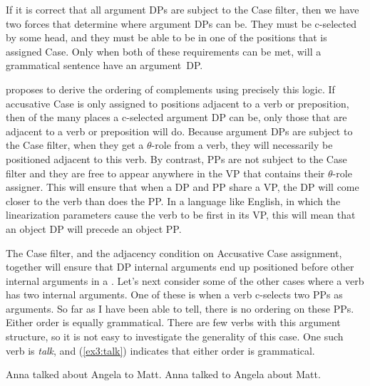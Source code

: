 If it is correct that all argument DPs are subject to the Case filter, then we have two forces that determine where argument DPs can be. They must be c-selected by some head, and they must be able to be in one of the positions that is assigned Case. Only when both of these requirements can be met, will a grammatical sentence have an argument~DP.

\citet{Stowell:1981} proposes to derive the ordering of complements using precisely this logic. If accusative Case is only assigned to positions adjacent to a verb or preposition, then of the many places a c-selected argument DP can be, only those that are adjacent to a verb or preposition will do. Because argument DPs are subject to the Case filter, when they get a \mbox{$\theta$-role} from a verb, they will necessarily be positioned adjacent to this verb. By contrast, PPs are not subject to the Case filter and they are free to appear anywhere in the VP that contains their \mbox{$\theta$-role} assigner. This will ensure that when a DP and PP share a VP, the DP will come closer to the verb than does the PP. In a language like English, in which the linearization parameters cause the verb to be first in its VP, this will mean that an object DP will precede an object PP. 

The Case filter, and the adjacency condition on Accusative Case assignment, together will ensure that DP internal arguments end up positioned before other internal arguments in a . Let's next consider some of the other cases where a verb has two internal arguments. One of these is when a verb c-selects two PPs as arguments. So far as I have been able to tell, there is no ordering on these PPs. Either order is equally grammatical. There are few verbs with this argument structure, so it is not easy to investigate the generality of this case. One such verb is \emph{talk}, and (\ref{ex3:talk}) indicates that either order is grammatical.
\begin{exe}
	\raggedright
	\ex \label{ex3:talk} 
	\begin{xlist}
		\ex Anna talked about Angela to Matt.
		\ex Anna talked to Angela about Matt.
	\end{xlist}
\end{exe}


